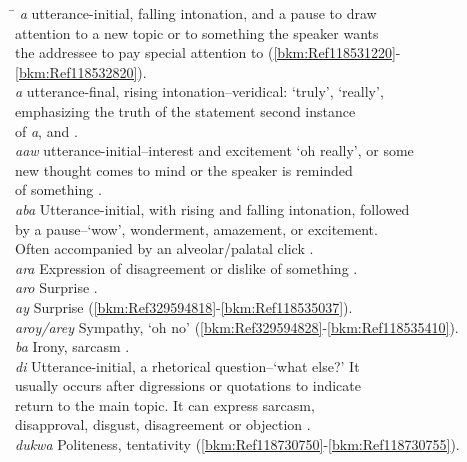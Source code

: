 \ea 
\begin{tabbing}
\hspace{1.7cm} \= \kill 
\textit{a} \> utterance-initial, falling intonation, and a pause to draw \\
\> attention to a new
   topic or to something the speaker wants \\ 
\> the addressee to pay special attention to  (\ref{bkm:Ref118531220}-\ref{bkm:Ref118532820}). \\
\textit{a} \> utterance-final, rising intonation--veridical: ‘truly’, ‘really’, \\
\> emphasizing the truth of the statement  second instance \\
\> of \textit{a}, and . \\
\textit{aaw} \> utterance-initial--interest and excitement ‘oh really’, or some \\
\> new thought comes to mind or the speaker is reminded \\
\> of something . \\
\textit{aba} \> Utterance-initial, with rising and falling intonation, followed \\
\> by a pause--‘wow’, wonderment, amazement, or excitement. \\
\> Often accompanied by  an alveolar/palatal click . \\
\textit{ara} \> Expression of disagreement or dislike of something . \\
\textit{aro} \> Surprise . \\
\textit{ay} \> Surprise (\ref{bkm:Ref329594818}-\ref{bkm:Ref118535037}). \\
\textit{aroy/arey} \> Sympathy, ‘oh no’ (\ref{bkm:Ref329594828}-\ref{bkm:Ref118535410}). \\
\textit{ba} \> Irony, sarcasm . \\
\textit{di} \> Utterance-initial, a rhetorical question--‘what else?’ It \\
\> usually occurs after digressions or quotations to indicate \\
\> return to the main topic. It can express sarcasm, \\
\> disapproval, disgust, disagreement or objection . \\
\textit{dukwa} \> Politeness, tentativity (\ref{bkm:Ref118730750}-\ref{bkm:Ref118730755}). \\

\end{tabbing}
